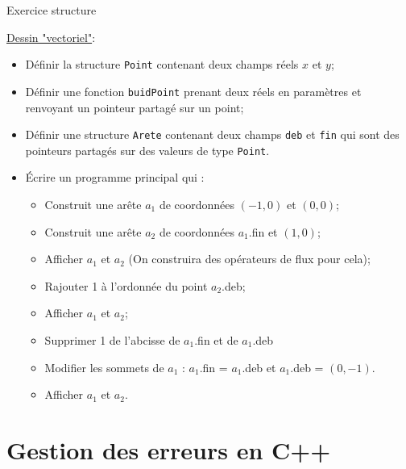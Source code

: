 \documentclass[compress,10pt,aspectratio=169]{beamer}
\begin{document}
  \begin{frame}[fragile]{Exercice structure}
    \scriptsize
  
  \underline{Dessin "vectoriel"}:
  \begin{itemize}
  \item Définir la structure \texttt{Point} contenant deux champs réels $x$ et $y$;
  \item Définir une fonction \texttt{buidPoint} prenant deux réels en paramètres et renvoyant un pointeur partagé sur un point;
  \item Définir une structure \texttt{Arete} contenant deux champs \texttt{deb} et \texttt{fin} qui sont des pointeurs partagés sur 
        des valeurs de type \texttt{Point}.
  \item \'Ecrire un programme principal qui :
  \begin{itemize}
  \scriptsize
  \item Construit une arête $a_{1}$ de coordonnées $(-1,0)$ et $(0,0)$;
  \item Construit une arête $a_{2}$ de coordonnées $a_{1}$.fin et $(1,0)$;
  \item Afficher $a_{1}$ et $a_{2}$ (On construira des opérateurs de flux pour cela);
  \item Rajouter 1 à l'ordonnée du point $a_{2}$.deb;
  \item Afficher $a_{1}$ et $a_{2}$;
  \item Supprimer 1 de l'abcisse de $a_{1}$.fin et de $a_{1}$.deb
  \item Modifier les sommets de $a_{1}$ : $a_{1}$.fin = $a_{1}$.deb et $a_{1}$.deb = $(0,-1)$.
  \item Afficher $a_{1}$ et $a_{2}$.
  \end{itemize}
  \end{itemize}
  \end{frame}

  \section{Gestion des erreurs en C++}
\end{document}
